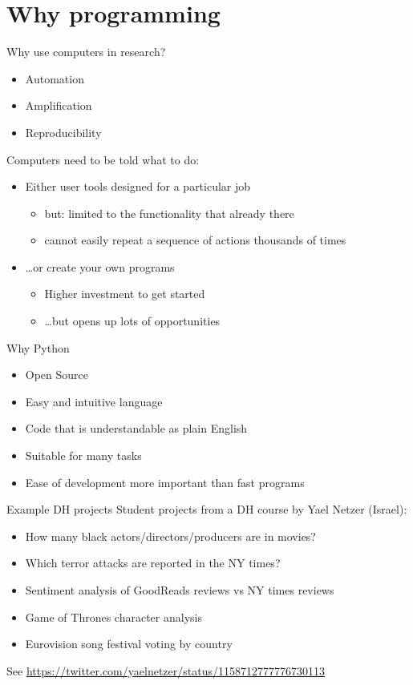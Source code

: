 \documentclass{beamer}
\begin{document}
\section{Why programming}
\begin{frame}
	Why use computers in research?
	\begin{itemize}
		\item Automation
		\item Amplification
		\item Reproducibility
	\end{itemize}

	\pause
	Computers need to be told what to do:

	\begin{itemize}
	\item Either user tools designed for a particular job
		\begin{itemize}
			\item but: limited to the functionality that already there
			\item cannot easily repeat a sequence of actions thousands of times
		\end{itemize}

	\item \dots or create your own programs
		\begin{itemize}
			\item Higher investment to get started
			\item \dots but opens up lots of opportunities
		\end{itemize}
	\end{itemize}
\end{frame}

\begin{frame}{Why Python}
	\begin{itemize}
		\item Open Source
		\item Easy and intuitive language
		\item Code that is understandable as plain English
		\item Suitable for many tasks
		\item Ease of development more important than fast programs
	\end{itemize}
\end{frame}


\begin{frame}{Example DH projects}
	Student projects from a DH course by Yael Netzer (Israel):
	\begin{itemize}
		\item How many black actors/directors/producers are in movies?
		\item Which terror attacks are reported in the NY times?
		\item Sentiment analysis of GoodReads reviews vs NY times reviews
		\item Game of Thrones character analysis
		\item Eurovision song festival voting by country
	\end{itemize}

	See \url{https://twitter.com/yaelnetzer/status/1158712777776730113}
\end{frame}
\end{document}
